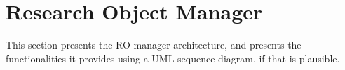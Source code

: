 \section{Research Object Manager}
This section presents the RO manager architecture, and presents the functionalities it provides using  a UML sequence diagram, if that is plausible. 